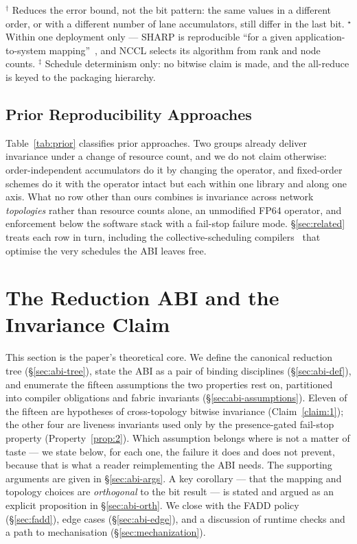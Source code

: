 \documentclass[journal,10pt]{IEEEtran}
\theoremstyle{plain}
\theoremstyle{definition}
\theoremstyle{remark}
\begin{document}
\begin{table}[!t]
\footnotesize
$^{\dagger}$ Reduces the error bound, not the bit pattern: the same values
in a different order, or with a different number of lane accumulators, still
differ in the last bit.
$^{\star}$ Within one deployment only --- SHARP is reproducible ``for a given
application-to-system mapping''~\cite{mellanox2019aggregation}, and NCCL
selects its algorithm from rank and node counts.
$^{\ddagger}$ Schedule determinism only: no bitwise claim is made, and the
all-reduce is keyed to the packaging hierarchy.
\end{table}

\subsection{Prior Reproducibility Approaches}

Table~\ref{tab:prior} classifies prior approaches. Two groups already
deliver invariance under a change of resource count, and we do not claim
otherwise: order-independent accumulators do it by changing the operator,
and fixed-order schemes do it with the operator intact but each within one
library and along one axis. What no row other than ours combines is
invariance across network \emph{topologies} rather than resource counts
alone, an unmodified FP64 operator, and enforcement below the software stack
with a fail-stop failure mode. \S\ref{sec:related} treats each row in turn,
including the collective-scheduling
compilers~\cite{shah2023taccl,cai2021synthesizing,wang2020blink} that
optimise the very schedules the ABI leaves free.

\section{The Reduction ABI and the Invariance Claim}\label{sec:abi}

This section is the paper's theoretical core. We define the canonical
reduction tree (\S\ref{sec:abi-tree}), state the ABI as a pair of
binding disciplines (\S\ref{sec:abi-def}), and enumerate the fifteen
assumptions the two properties rest on, partitioned into compiler
obligations and fabric invariants (\S\ref{sec:abi-assumptions}). Eleven
of the fifteen are hypotheses of cross-topology bitwise invariance
(Claim~\ref{claim:1}); the other four are liveness invariants used only
by the presence-gated fail-stop property (Property~\ref{prop:2}). Which
assumption belongs where is not a matter of taste --- we state below,
for each one, the failure it does and does not prevent, because that is
what a reader reimplementing the ABI needs. The supporting arguments are
given in \S\ref{sec:abi-args}. A key corollary --- that the mapping and
topology choices are \emph{orthogonal} to the bit result --- is stated
and argued as an explicit proposition in \S\ref{sec:abi-orth}. We close with the FADD policy
(\S\ref{sec:fadd}), edge cases (\S\ref{sec:abi-edge}), and a discussion
of runtime checks and a path to mechanisation
(\S\ref{sec:mechanization}).
\end{document}
